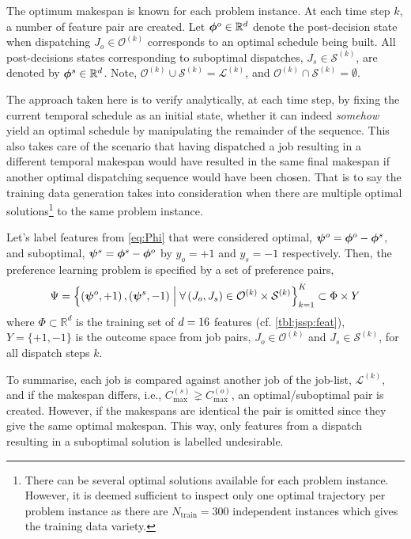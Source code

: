 \documentclass[smallextended]{svjour3}
\begin{document}
	The optimum makespan is known for each problem instance. At each time step $k$, 
	a number of feature pair are created. 
	Let $\bm{\phi}^{o}\in{\mathbb R}^d$ denote the post-decision state when dispatching 
	$J_o\in\mathcal{O}^{(k)}$ corresponds to an optimal schedule being built. 
	All post-decisions states corresponding to suboptimal dispatches, 
	$J_s\in\mathcal{S}^{(k)}$, are denoted by $\bm{\phi}^{s}\in{\mathbb R}^d$.
	Note, \mbox{$\mathcal{O}^{(k)}\cup\mathcal{S}^{(k)}=\mathcal{L}^{(k)}$}, and 
	\mbox{$\mathcal{O}^{(k)}\cap\mathcal{S}^{(k)}=\emptyset$}.
	
	The approach taken here is to verify analytically, at each time step, by fixing 
	the current temporal schedule as an initial state, whether it can indeed 
	\emph{somehow} yield an optimal schedule by manipulating the remainder of the 
	sequence. This also takes care of the scenario that having dispatched a job 
	resulting in a different temporal makespan would have resulted in the same 
	final makespan if another optimal dispatching sequence would have been chosen. 
	That is to say the training data generation takes into consideration when there 
	are multiple optimal solutions\footnote{
		There can be several optimal solutions available for each problem instance. 
		However, it is deemed sufficient to inspect only one optimal trajectory per 
		problem instance as there are $N_{\text{train}}=300$ independent instances 
		which gives the training data variety.} 
	to the same problem instance. 
	
	Let's label features from \cref{eq:Phi} that were considered optimal, 
	\mbox{$\bm \psi^{o}=\bm{\phi}^{o}-\bm{\phi}^{s}$}, and suboptimal, 
	\mbox{$\bm \psi^{s}=\bm{\phi}^{s}-\bm{\phi}^{o}$} by $y_o=+1$ and $y_s=-1$ respectively.  
	Then, the preference learning problem is specified by a set of preference pairs,
	\begin{equation}
	\Psi = 
	\left\{\left(\bm \psi^o,+1\right),\left(\bm \psi^s,-1\right)
	\;\middle|\;\forall \left(J_o,J_s\right) \in \mathcal{O}^{(k)} \times 
	\mathcal{S}^{(k)}\right\}_{k=1}^{K} \subset \Phi\times Y \label{eq:prefset}
	\end{equation}
	where $\Phi\subset \mathbb{R}^d$ is the training set of $d=16$ 
	features (cf. \cref{tbl:jssp:feat}), $Y=\{+1,-1\}$ is the outcome space from 
	job pairs, $J_o\in\mathcal{O}^{(k)}$ and $J_s\in\mathcal{S}^{(k)}$, for all 
	dispatch steps $k$.
	
	To summarise, each job is compared against another job of the job-list, 
	$\mathcal{L}^{(k)}$, and if the makespan differs, i.e., $C_{\max}^{(s)}\gneq 
	C_{\max}^{(o)}$, an optimal/suboptimal pair is created. 
	However, if the makespans are identical the pair is omitted since they give the 
	same optimal makespan. 
	This way, only features from a dispatch resulting in a suboptimal solution is 
	labelled undesirable.
	
\end{document}

